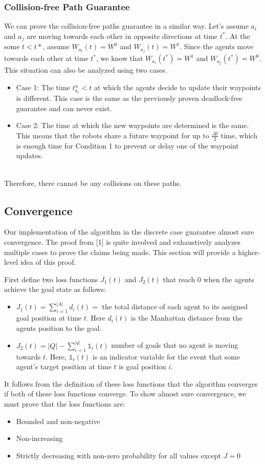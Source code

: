 \subsubsection{Collision-free Path Guarantee}
We can prove the collision-free paths guarantee in a similar way. Let's assume $a_i$ and $a_j$ are moving towards each other in opposite directions at time $t^*$. At the some $t < t*$, assume $W_{a_i}(t) = W^0$ and $W_{a_j}(t) = W^1$. Since the agents move towards each other at time $t^*$, we know that $W_{a_i}(t^*) = W^1$ and $W_{a_j}(t^*) = W^0$. This situation can also be analyzed using two cases. 
\begin{itemize}
    \item Case 1: The time $t_{a_i}^{u} < t$ at which the agents decide to update their waypoints is different. This case is the same as the previously proven deadlock-free guarantee and can never exist. 
\item Case 2: The time at which the new waypoints are determined is the same. This means that the robots share a future waypoint for up to $\frac{\Delta t}{2}$ time, which is enough time for Condition 1 to prevent or delay one of the waypoint updates.
\end{itemize}
\\
Therefore, there cannot be any collisions on these paths.

\subsection{Convergence}

Our implementation of the algorithm in the discrete case guarantee almost sure convergence. The proof from [1] is quite involved and exhaustively analyzes multiple cases to prove the claims being made. This section will provide a higher-level idea of this proof. 

First define two loss functions $J_1(t)$ and $J_2(t)$ that reach 0 when the agents achieve the goal state as follows: 
\begin{itemize}
    \item $J_1(t) = \sum_{i=1}^{|A|} d_i(t) = $ the total distance of each agent to its assigned goal position at time $t$. Here $d_i(t)$ is the Manhattan distance from the agents position to the goal.
    \item $J_2(t) = |Q| -  \sum_{i=1}^{|q|} \mathbb{1}_i(t) $ number of goals that no agent is moving towards  $t$. Here, $\mathbb{1}_i(t)$ is an indicator variable for the event that some agent's target position at time $t$ is goal position $i$.
\end{itemize}
It follows from the definition of these loss functions that the algorithm converges if both of these loss functions converge. 
To show almost sure convergence, we must prove that the loss functions are:
\begin{itemize}
    \item Bounded and non-negative 
    \item Non-increasing
    \item Strictly decreasing with non-zero probability for all values except $J = 0$
\end{itemize}

